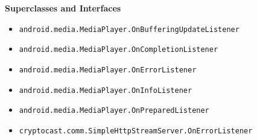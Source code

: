 \textbf{\sffamily Superclasses and Interfaces}
\begin{itemize}
\item \lstinline|android.media.MediaPlayer.OnBufferingUpdateListener|
\item \lstinline|android.media.MediaPlayer.OnCompletionListener|
\item \lstinline|android.media.MediaPlayer.OnErrorListener|
\item \lstinline|android.media.MediaPlayer.OnInfoListener|
\item \lstinline|android.media.MediaPlayer.OnPreparedListener|
\item \lstinline|cryptocast.comm.SimpleHttpStreamServer.OnErrorListener|
\end{itemize}



